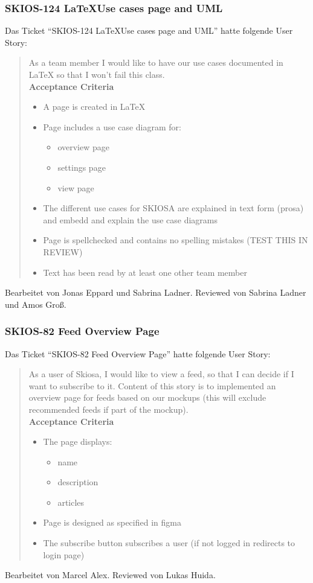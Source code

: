 \subsubsection{SKIOS-124 \LaTeX Use cases page and UML}
Das Ticket \enquote{SKIOS-124 \LaTeX Use cases page and UML} hatte folgende User Story:
\begin{quotation}
    As a team member I would like to have our use cases documented in LaTeX so that I won't fail this class. \\
\textbf{Acceptance Criteria}
\begin{itemize}
    \item A page is created in LaTeX
    \item Page includes a use case diagram for:
    \begin{itemize}
        \item overview page
        \item settings page
        \item view page
    \end{itemize}
    \item The different use cases for SKIOSA are explained in text form (prosa) and embedd and explain the use case diagrams
    \item Page is spellchecked and contains no spelling mistakes (TEST THIS IN REVIEW)
    \item Text has been read by at least one other team member
\end{itemize}
\end{quotation}
Bearbeitet von Jonas Eppard und Sabrina Ladner.
Reviewed von Sabrina Ladner und Amos Groß.

\subsubsection{SKIOS-82 Feed Overview Page}
Das Ticket \enquote{SKIOS-82 Feed Overview Page} hatte folgende User Story:
\begin{quotation}
    As a user of Skiosa, I would like to view a feed, so that I can decide if I want to subscribe to it.
    Content of this story is to implemented an overview page for feeds based on our mockups (this will exclude recommended feeds if part of the mockup). \\
\textbf{Acceptance Criteria}
\begin{itemize}
    \item The page displays: 
    \begin{itemize}
        \item name
        \item description
        \item articles
    \end{itemize}
    \item Page is designed as specified in figma
    \item The subscribe button subscribes a user (if not logged in redirects to login page)
\end{itemize}
\end{quotation}
Bearbeitet von Marcel Alex.
Reviewed von Lukas Huida.

